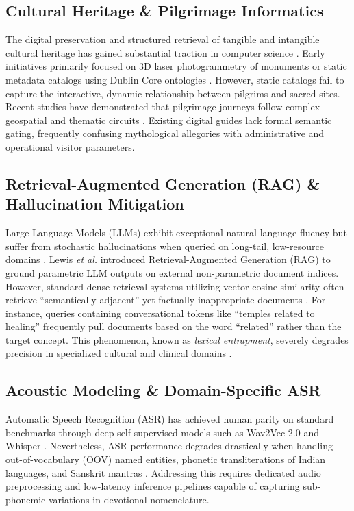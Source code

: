 \documentclass[lettersize,journal]{IEEEtran}
\begin{document}
\subsection{Cultural Heritage \& Pilgrimage Informatics}
The digital preservation and structured retrieval of tangible and intangible cultural heritage has gained substantial traction in computer science \cite{niccolucci2019metadata,ioannides2020digital}. Early initiatives primarily focused on 3D laser photogrammetry of monuments \cite{remondino20143d} or static metadata catalogs using Dublin Core ontologies \cite{hillmann2005using}. However, static catalogs fail to capture the interactive, dynamic relationship between pilgrims and sacred sites. Recent studies have demonstrated that pilgrimage journeys follow complex geospatial and thematic circuits \cite{jacobsen2013pilgrimage}. Existing digital guides lack formal semantic gating, frequently confusing mythological allegories with administrative and operational visitor parameters.

\subsection{Retrieval-Augmented Generation (RAG) \& Hallucination Mitigation}
Large Language Models (LLMs) exhibit exceptional natural language fluency but suffer from stochastic hallucinations when queried on long-tail, low-resource domains \cite{liu2024lost}. Lewis \textit{et al.} \cite{lewis2020retrieval} introduced Retrieval-Augmented Generation (RAG) to ground parametric LLM outputs on external non-parametric document indices. However, standard dense retrieval systems utilizing vector cosine similarity often retrieve ``semantically adjacent'' yet factually inappropriate documents \cite{siriwardhana2023improving}. For instance, queries containing conversational tokens like ``temples related to healing'' frequently pull documents based on the word ``related'' rather than the target concept. This phenomenon, known as \textit{lexical entrapment}, severely degrades precision in specialized cultural and clinical domains \cite{shao2024enhancing}.

\subsection{Acoustic Modeling \& Domain-Specific ASR}
Automatic Speech Recognition (ASR) has achieved human parity on standard benchmarks through deep self-supervised models such as Wav2Vec 2.0 \cite{baevski2020wav2vec} and Whisper \cite{radford2023robust}. Nevertheless, ASR performance degrades drastically when handling out-of-vocabulary (OOV) named entities, phonetic transliterations of Indian languages, and Sanskrit mantras \cite{thomas2022acoustic}. Addressing this requires dedicated audio preprocessing and low-latency inference pipelines capable of capturing sub-phonemic variations in devotional nomenclature.
\end{document}
